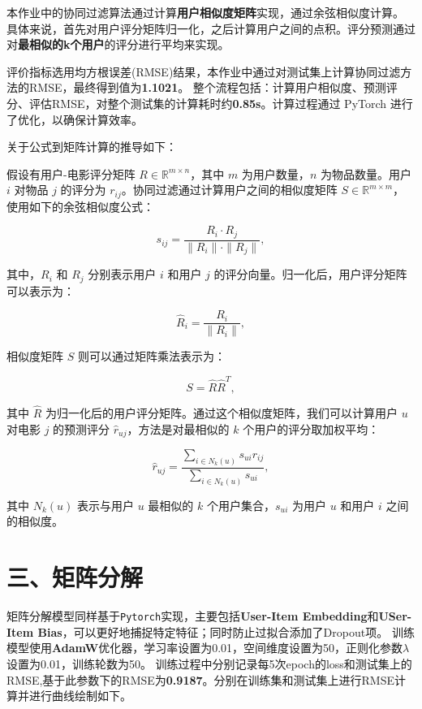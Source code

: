 \documentclass[12pt]{ctexart}
\begin{document}
本作业中的协同过滤算法通过计算\textbf{用户相似度矩阵}实现，通过余弦相似度计算。
具体来说，首先对用户评分矩阵归一化，之后计算用户之间的点积。评分预测通过对\textbf{最相似的k个用户}的评分进行平均来实现。

评价指标选用均方根误差(RMSE)结果，本作业中通过对测试集上计算协同过滤方法的RMSE，最终得到值为\textbf{1.1021}。
整个流程包括：计算用户相似度、预测评分、评估RMSE，对整个测试集的计算耗时约\textbf{0.85s}。计算过程通过 PyTorch 进行了优化，以确保计算效率。

关于公式到矩阵计算的推导如下：

假设有用户-电影评分矩阵 $R \in \mathbb{R}^{m \times n}$，其中 $m$ 为用户数量，$n$ 为物品数量。用户 $i$ 对物品 $j$ 的评分为 $r_{ij}$。协同过滤通过计算用户之间的相似度矩阵 $S \in \mathbb{R}^{m \times m}$，使用如下的余弦相似度公式：

\begin{equation}
    s_{ij} = \frac{R_i \cdot R_j}{\|R_i\| \cdot \|R_j\|},
\end{equation}

其中，$R_i$ 和 $R_j$ 分别表示用户 $i$ 和用户 $j$ 的评分向量。归一化后，用户评分矩阵可以表示为：

\begin{equation}
    \hat{R}_i = \frac{R_i}{\|R_i\|},
\end{equation}

相似度矩阵 $S$ 则可以通过矩阵乘法表示为：

\begin{equation}
    S = \hat{R} \hat{R}^T,
\end{equation}

其中 $\hat{R}$ 为归一化后的用户评分矩阵。通过这个相似度矩阵，我们可以计算用户 $u$ 对电影 $j$ 的预测评分 $\hat{r}_{uj}$，方法是对最相似的 $k$ 个用户的评分取加权平均：

\begin{equation}
    \hat{r}_{uj} = \frac{\sum_{i \in N_k(u)} s_{ui} r_{ij}}{\sum_{i \in N_k(u)} s_{ui}},
\end{equation}

其中 $N_k(u)$ 表示与用户 $u$ 最相似的 $k$ 个用户集合，$s_{ui}$ 为用户 $u$ 和用户 $i$ 之间的相似度。

\section*{三、矩阵分解}

矩阵分解模型同样基于\texttt{Pytorch}实现，主要包括\textbf{User-Item Embedding}和\textbf{USer- Item Bias}，可以更好地捕捉特定特征；同时防止过拟合添加了Dropout项。
训练模型使用\textbf{AdamW}优化器，学习率设置为0.01，空间维度设置为50，正则化参数$\lambda$设置为0.01，训练轮数为50。
训练过程中分别记录每5次epoch的loss和测试集上的RMSE,基于此参数下的RMSE为\textbf{0.9187}。分别在训练集和测试集上进行RMSE计算并进行曲线绘制如下。
\end{document}
